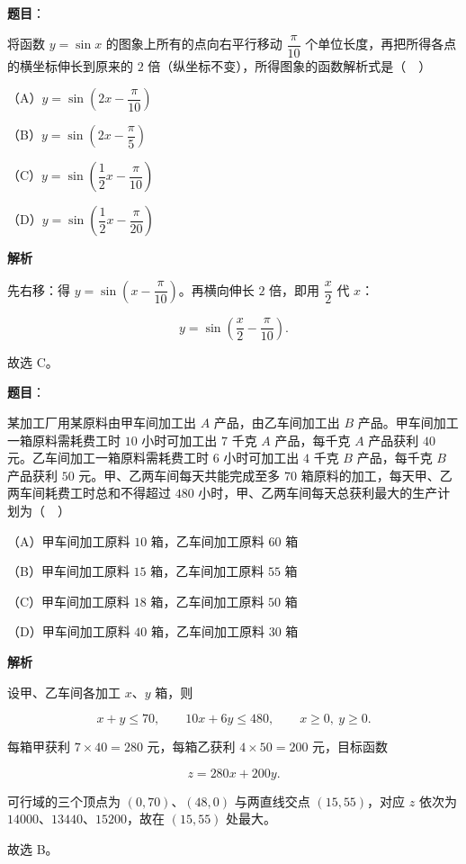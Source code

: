 \begin{answer}

\textbf{题目}：

将函数 $y=\sin x$ 的图象上所有的点向右平行移动 $\dfrac{\pi}{10}$ 个单位长度，再把所得各点的横坐标伸长到原来的 $2$ 倍（纵坐标不变），所得图象的函数解析式是（　）

（A）$y=\sin\left(2x-\dfrac{\pi}{10}\right)$

（B）$y=\sin\left(2x-\dfrac{\pi}{5}\right)$

（C）$y=\sin\left(\dfrac{1}{2}x-\dfrac{\pi}{10}\right)$

（D）$y=\sin\left(\dfrac{1}{2}x-\dfrac{\pi}{20}\right)$

\textbf{解析}

先右移：得 $y=\sin\left(x-\dfrac{\pi}{10}\right)$。再横向伸长 $2$ 倍，即用 $\dfrac x2$ 代 $x$：

\nopagebreak[4]
\[y=\sin\left(\frac x2-\frac{\pi}{10}\right).\]

故选 C。


\end{answer}
\begin{answer}

\textbf{题目}：

某加工厂用某原料由甲车间加工出 $A$ 产品，由乙车间加工出 $B$ 产品。甲车间加工一箱原料需耗费工时 $10$ 小时可加工出 $7$ 千克 $A$ 产品，每千克 $A$ 产品获利 $40$ 元。乙车间加工一箱原料需耗费工时 $6$ 小时可加工出 $4$ 千克 $B$ 产品，每千克 $B$ 产品获利 $50$ 元。甲、乙两车间每天共能完成至多 $70$ 箱原料的加工，每天甲、乙两车间耗费工时总和不得超过 $480$ 小时，甲、乙两车间每天总获利最大的生产计划为（　）

（A）甲车间加工原料 $10$ 箱，乙车间加工原料 $60$ 箱

（B）甲车间加工原料 $15$ 箱，乙车间加工原料 $55$ 箱

（C）甲车间加工原料 $18$ 箱，乙车间加工原料 $50$ 箱

（D）甲车间加工原料 $40$ 箱，乙车间加工原料 $30$ 箱

\textbf{解析}

设甲、乙车间各加工 $x$、$y$ 箱，则

\nopagebreak[4]
\[x+y\leqslant70,\qquad 10x+6y\leqslant480,\qquad x\geqslant0,\ y\geqslant0.\]

每箱甲获利 $7\times40=280$ 元，每箱乙获利 $4\times50=200$ 元，目标函数

\nopagebreak[4]
\[z=280x+200y.\]

可行域的三个顶点为 $(0,70)$、$(48,0)$ 与两直线交点 $(15,55)$，对应 $z$ 依次为 $14000$、$13440$、$15200$，故在 $(15,55)$ 处最大。

故选 B。


\end{answer}
